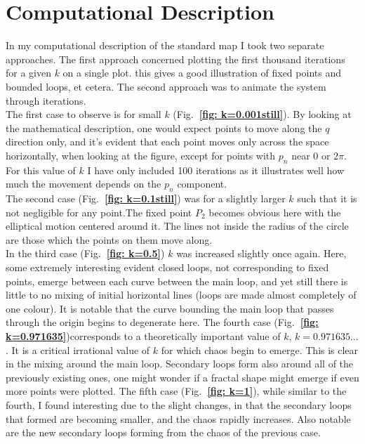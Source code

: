 \documentclass{article}
\begin{document}
\section{Computational Description}
In my computational description of the standard map I took two separate approaches. The first approach concerned plotting the first thousand iterations for a given $k$ on a single plot. this gives a good illustration of fixed points and bounded loops, et cetera. The second approach was to animate the system through iterations.\\
\indent The first case to observe is for small $k$ (Fig.\textbf{~\ref{fig: k=0.001still}}). By looking at the mathematical description, one would expect points to move along the $q$ direction only, and it's evident that each point moves only across the space horizontally, when looking at the figure, except for points with $p_n$ near 0 or $2\pi$. For this value of $k$ I have only included 100 iterations as it illustrates well how much the movement depends on the $p_n$ component.\\
\indent The second case (Fig.\textbf{~\ref{fig: k=0.1still}}) was for a slightly larger $k$ such that it is not negligible for any point.The fixed point $P_2$ becomes obvious here with the elliptical motion centered around it. The lines not inside the radius of the circle are those which the points on them move along.\\
\indent In the third case (Fig.\textbf{~\ref{fig: k=0.5}}) $k$ was increased slightly once again. Here, some extremely interesting evident closed loops, not corresponding to fixed points, emerge between each curve between the main loop, and yet still there is little to no mixing of initial horizontal lines (loops are made almost completely of one colour). It is notable that the curve bounding the main loop that passes through the origin begins to degenerate here.
\indent The fourth case (Fig.\textbf{~\ref{fig: k=0.971635}})corresponds to a theoretically important value of $k$, $k=0.971635...$. It is a critical irrational value of $k$ for which chaos begin to emerge. This is clear in the mixing around the main loop. Secondary loops form also around all of the previously existing ones, one might wonder if a fractal shape might emerge if even more points were plotted.
\indent The fifth case (Fig.\textbf{~\ref{fig: k=1}}), while similar to the fourth, I found interesting due to the slight changes, in that the secondary loops that formed are becoming smaller, and the chaos rapidly increases. Also notable are the new secondary loops forming from the chaos of the previous case.\\
\end{document}
